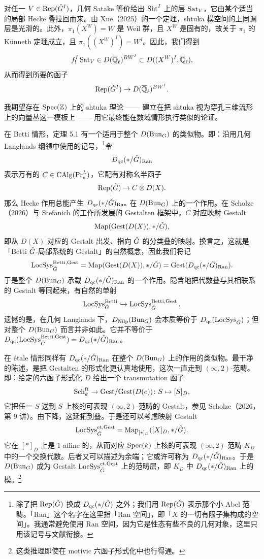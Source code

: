 对任一 $V\in\operatorname{Rep}(\check{G}^I)$，几何 Satake 等价给出 $\operatorname{Sht}^I$ 上的层 $\operatorname{Sat}_V$，它由某个适当的局部 Hecke 叠拉回而来。由 Xue（2025）的一个定理，shtuka 模空间的上同调层是光滑的。此外，$\pi_1(X^W)=W$ 是 Weil 群，且 $X^W$ 是固有的，故关于 $\pi_1$ 的 Künneth 定理成立，且 $\pi_1((X^W)^I)=W^I$。因此，我们得到
\[
f^I_!\operatorname{Sat}_V\in D(\overline{\mathbb{Q}}_{\ell})^{BW^I}\subset D((X^W)^I,\overline{\mathbb{Q}}_{\ell}),
\]
从而得到所要的函子
\[
\operatorname{Rep}(\check{G}^I)\to D(\overline{\mathbb{Q}}_{\ell})^{BW^I}.
\]

我期望存在 $\operatorname{Spec}(\mathbb{Z})$ 上的 shtuka 理论 —— 建立在把 shtuka 视为穿孔三维流形上的向量丛这一模板上 —— 用它最终能在数域情形执行类似的论证。

\begin{remark}
在 Betti 情形，定理 5.1 有一个适用于整个 $D(\operatorname{Bun}_G)$ 的类似物。即：沿用几何 Langlands 纲领中使用的记号，\footnote{除了把 $\operatorname{Rep}(\check{G})$ 换成 $D_{\mathrm{qc}}(\ast/\check{G})$ 之外；我们用 $\operatorname{Rep}(\check{G})$ 表示那个小 Abel 范畴。「Ran」这个名字在这里指「Ran 空间」，即「$X$ 的一切有限子集构成的空间」。我通常避免使用 Ran 空间，因为它是性态有些不良的几何对象，这里只用该记号与文献衔接。}令
\[
D_{\mathrm{qc}}(\ast/\check{G})_{\mathrm{Ran}}
\]
表示万有的 $C\in\operatorname{CAlg}(\mathrm{Pr}^{L}_{\mathit{e}})$，它配有对称幺半函子
\[
\operatorname{Rep}(\check{G})\to C\otimes D(X).
\]
那么 Hecke 作用总能产生 $D_{\mathrm{qc}}(\ast/\check{G})_{\mathrm{Ran}}$ 在 $D(\operatorname{Bun}_G)$ 上的一个作用。在 Scholze（2026）与 Stefanich 的工作所发展的 Gestalten 框架中，$C$ 对应映射 Gestalt
\[
\operatorname{Map}(\mathrm{Gest}(D(X)),\ast/\check{G}),
\]
即从 $D(X)$ 对应的 Gestalt 出发、指向 $\check{G}$ 的分类叠的映射。换言之，这就是「Betti $\check{G}$-局部系统的 Gestalt」的自然概念，因此我们将记
\[
\operatorname{LocSys}^{\mathrm{Betti},\mathrm{Gest}}_{\check{G}}=\operatorname{Map}(\mathrm{Gest}(D(X)),\ast/\check{G})=\mathrm{Gest}(D_{\mathrm{qc}}(\ast/\check{G})_{\mathrm{Ran}}).
\]
于是整个 $D(\operatorname{Bun}_G)$ 承载 $D_{\mathrm{qc}}(\ast/\check{G})_{\mathrm{Ran}}$ 的一个作用。隐含地把代数叠与其相联系的 Gestalt 等同起来，有自然的单射
\[
\operatorname{LocSys}^{\mathrm{Betti}}_{\check{G}}\hookrightarrow\operatorname{LocSys}^{\mathrm{Betti},\mathrm{Gest}}_{\check{G}}.
\]
遗憾的是，在几何 Langlands 下，$D_{\mathrm{Nilp}}(\operatorname{Bun}_G)$ 会本质等价于 $D_{\mathrm{qc}}(\operatorname{LocSys}_{\check{G}})$；但对整个 $D(\operatorname{Bun}_G)$ 而言并非如此。它并不等价于 $D_{\mathrm{qc}}(\operatorname{LocSys}^{\mathrm{Betti},\mathrm{Gest}}_{\check{G}})=D_{\mathrm{qc}}(\ast/\check{G})_{\mathrm{Ran}}$。
\end{remark}

\begin{remark}
在 étale 情形同样有 $D_{\mathrm{qc}}(\ast/\check{G})_{\mathrm{Ran}}$ 在整个 $D(\operatorname{Bun}_G)$ 上的作用的类似物。最干净的陈述，是把 Gestalten 的形式化更认真地使用，这次一直走到 $(\infty,2)$-范畴。即：给定的六函子形式化 $D$ 给出一个 transmutation 函子
\[
\mathrm{Sch}^{\mathrm{ft}}_k\to\mathrm{Gest}/\mathrm{Gest}(D(e))\colon S\mapsto[S]_D,
\]
它把任一 $S$ 送到 $S$ 上核的可表现 $(\infty,2)$-范畴的 Gestalt，参见 Scholze（2026，第 9 讲）。由下降，这延拓到叠。于是还可以考虑映射 Gestalt
\[
\operatorname{LocSys}^{\mathrm{et},\mathrm{Gest}}_{\check{G}}=\operatorname{Map}_{[\ast]_D}([X]_D,\ast/\check{G}).
\]
它在 $[\ast]_D$ 上是 $1$-affine 的，从而对应 $\operatorname{Spec}(k)$ 上核的可表现 $(\infty,2)$-范畴 $K_D$ 中的一个交换代数。后者又可以描述为余端；它或许可称为 $D_{\mathrm{qc}}(\ast/\check{G})_{\mathrm{Ran}}$。于是 $D(\operatorname{Bun}_G)$ 成为 Gestalt $\operatorname{LocSys}^{\mathrm{et},\mathrm{Gest}}_{\check{G}}$ 上的范畴层，即 $K_D$ 中 $D_{\mathrm{qc}}(\ast/\check{G})_{\mathrm{Ran}}$ 上的模。\footnote{这类推理即使在 motivic 六函子形式化中也行得通。}
\end{remark}

